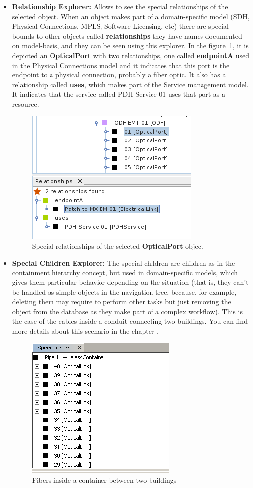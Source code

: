 \documentclass[a4paper]{article}
\begin{document}
	\begin{itemize}
		\item \textbf{Relationship Explorer:} Allows to see the special relationships of the selected object. When an object makes part of a domain-specific model (SDH, Physical Connections, MPLS, Software Licensing, etc) there are special bounds to other objects called \textbf{relationships} they have names documented on model-basis, and they can be seen using this explorer. In the figure~\ref{fig:navigation_tree_relationship_explorer}, it is depicted an \textbf{OpticalPort} with two relationships, one called \textbf{endpointA} used in the Physical Connections model and it indicates that this port is the endpoint to a physical connection, probably a fiber optic. It also has a relationship called \textbf{uses}, which makes part of the Service management model. It indicates that the service called PDH Service-01 uses that port as a resource.
			\begin{figure}[h!]
				\centering
				\includegraphics[width=0.4\linewidth]{img/navigation_tree_relationship_explorer.png}
				\caption{Special relationships of the selected \textbf{OpticalPort} object}
				\label{fig:navigation_tree_relationship_explorer}
			\end{figure}
		\item \textbf{Special Children Explorer:} The special children are children as in the containment hierarchy concept, but used in domain-specific models, which gives them particular behavior depending on the situation (that is, they can't be handled as simple objects in the navigation tree, because, for example, deleting them may require to perform other tasks but just removing the object from the database as they make part of a complex workflow). This is the case of the cables inside a conduit connecting two buildings. You can find more details about this scenario in the chapter \textbf{}.
			\begin{figure}[h!]
				\centering
				\includegraphics[width=0.3\linewidth]{img/navigation_tree_special_children_explorer.png}
				\caption{Fibers inside a container between two buildings}
				\label{fig:navigation_tree_special_children_explorer}
			\end{figure}
	\end{itemize}
	\newpage
\end{document}
